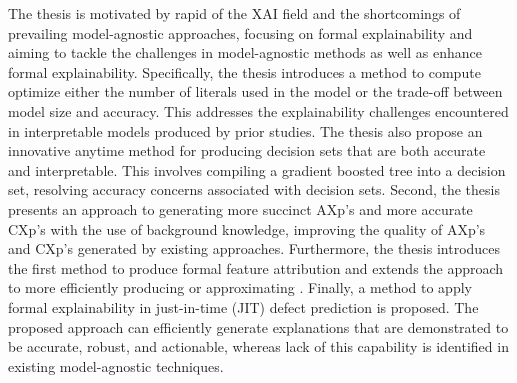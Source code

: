 The thesis is motivated by rapid  of the XAI field and the shortcomings 
of prevailing model-agnostic approaches, focusing on formal explainability
and aiming to tackle the challenges in model-agnostic methods as well
as enhance formal explainability.
%
Specifically, the thesis introduces a method to compute
optimize either 
the number of literals used in the model or the trade-off between model size and accuracy.
%
This addresses the explainability challenges encountered in interpretable models 
produced by prior studies.
%
The thesis also propose an innovative anytime method for producing decision sets
that are both accurate and interpretable.
%
This involves compiling a gradient boosted tree into a decision set, 
resolving accuracy concerns associated with decision sets.
%
Second, the thesis presents an approach to generating more succinct AXp's and more accurate CXp's 
with the use of background knowledge, improving the quality of AXp's and CXp's generated by
existing approaches.
%
Furthermore, the thesis introduces the first method to produce formal feature
attribution
and extends the approach to more efficiently producing or approximating .
%
Finally, a method to apply formal explainability in just-in-time (JIT) defect prediction is proposed.
%
The proposed approach can efficiently generate explanations that are demonstrated
to be accurate, robust, and actionable, whereas lack of this capability is 
identified in existing model-agnostic techniques.






% 

